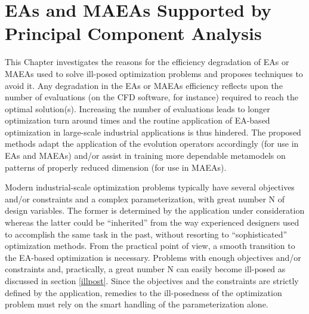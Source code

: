 \ifpdf
    \graphicspath{{4/figures/PNG/}{4/figures/PDF/}{3/figures/}}
\else
    \graphicspath{{4/figures/EPS/}{4/figures/}}
\fi

\chapter{EAs and MAEAs Supported by Principal Component Analysis} %
\label{VarCorrChapter}

This Chapter investigates the reasons for the efficiency degradation of EAs or MAEAs used to solve ill-posed optimization problems \cite{Salomon,Roy_2002a,Ghisu_2010} and proposes techniques to avoid it. Any degradation in the EAs or MAEAs efficiency reflects upon the number of evaluations (on the CFD software, for instance) required to reach the optimal solution(s). Increasing the number of evaluations leads to longer optimization turn around times and the routine application of EA-based optimization in large-scale industrial applications is thus hindered. The proposed methods adapt the application of the evolution operators accordingly (for use in EAs and MAEAs) and/or assist in training more dependable metamodels on patterns of properly reduced dimension (for use in MAEAs).

Modern industrial-scale optimization problems typically have several objectives and/or constraints  and a complex parameterization, with great number N of design variables. The former is determined by the application under consideration whereas the latter could be ``inherited'' from the way experienced designers used to accomplish the same task in the past, without resorting to ``sophisticated'' optimization methods. From the practical point of view, a smooth transition to the EA-based optimization is necessary. Problems with enough objectives and/or constraints and, practically, a great number N can easily become ill-posed as discussed in section \ref{illpost}. Since the objectives and the constraints are strictly defined by the application, remedies to the ill-posedness of the optimization problem must rely on the smart handling of the parameterization alone. 


